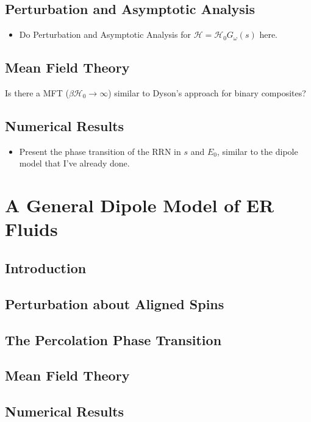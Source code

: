 \documentclass[english,12pt]{ttuthes}
\newcommand{\Hc}{\mathcal{H}}
\begin{document}
\subsection{Perturbation and Asymptotic Analysis}
\label{subsec:TACM_Pert_Asymp_Analysis}
\begin{itemize}
\item Do Perturbation and Asymptotic Analysis for
  $\Hc=\Hc_0G_\omega(s)$ here.
\end{itemize}
%
\subsection{Mean Field Theory}
\label{subsec:TACM_MFT}
Is there a MFT ($\beta\Hc_0\to\infty$) similar to Dyson's approach for
binary composites?
%
\subsection{Numerical Results}
\label{subsec:TACM_Numerics}
\begin{itemize}
\item Present the phase transition of the RRN in $s$ and $E_0$,
  similar to the dipole model that I've already done.
\end{itemize}
%
%
\section{A General Dipole Model of ER Fluids}
\label{subsec:GDM}
%
\subsection{Introduction}
\label{subsec:GDM_Intro}
%
\subsection{Perturbation about Aligned Spins}
\label{subsec:GDM_Pert}
%
\subsection{The Percolation Phase Transition}
\label{subsec:GDM_Percolation}
%
\subsection{Mean Field Theory}
\label{subsec:GDM_MFT}
%
\subsection{Numerical Results}
\label{subsubsec:GDM_Numerics}
%
\end{document}
